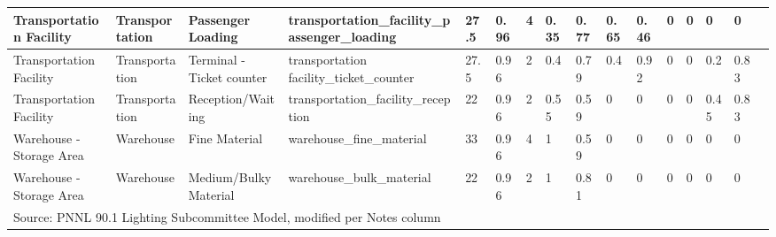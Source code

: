 \begin{center}
\begin{landscape}
\begin{longtable}{|p{0.75in}|p{0.75in}|p{0.75in}|p{0.75in}|p{0.3in}|p{0.3in}|p{0.3in}|p{0.3in}|p{0.3in}|p{0.3in}|p{0.3in}|p{0.3in}|p{0.3in}|p{0.3in}|p{0.3in}|p{0.6in}|}
      Transportation Facility                 & Transportation              & Passenger Loading                               & transportation\_facility\_passenger\_loading                    & 27.5 & 0.96 & 4  & 0.35   & 0.77  & 0.65  & 0.46  & 0    & 0    & 0    & 0    &                                                                                       \\ \hline
      Transportation Facility                 & Transportation              & Terminal - Ticket counter                       & transportation facility\_ticket\_counter                        & 27.5 & 0.96 & 2  & 0.4    & 0.79  & 0.4   & 0.92  & 0    & 0    & 0.2  & 0.83 &                                                                                       \\ \hline
      Transportation Facility                 & Transportation              & Reception/Waiting                               & transportation\_facility\_reception                             & 22   & 0.96 & 2  & 0.55   & 0.59  & 0     & 0     & 0    & 0    & 0.45 & 0.83 &                                                                                       \\ \hline
      Warehouse - Storage Area                & Warehouse                   & Fine Material                                   & warehouse\_fine\_material                                       & 33   & 0.96 & 4  & 1      & 0.59  & 0     & 0     & 0    & 0    & 0    & 0    &                                                                                       \\ \hline
      Warehouse - Storage Area                & Warehouse                   & Medium/Bulky Material                           & warehouse\_bulk\_material                                       & 22   & 0.96 & 2  & 1      & 0.81  & 0     & 0     & 0    & 0    & 0    & 0    &                                                                                       \\ \hline
    \multicolumn{5}{l}{Source: PNNL 90.1 Lighting Subcommittee Model, modified per Notes column} \\
    \end{longtable}
    \end{landscape}
 \end{center}